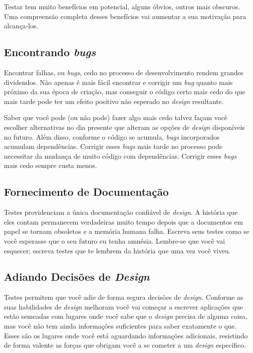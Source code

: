 Testar tem muito benefícios em potencial, alguns óbvios, outros mais obscuros. Uma compreensão completa desses benefícios vai aumentar a sua motivação para alcança-los.

\subsection{Encontrando \textit{bugs}}

Encontrar falhas, ou \textit{bugs}, cedo no processo de desenvolvimento rendem grandes dividendos. Não apenas é mais fácil encontrar e corrigir um \textit{bug} quanto mais próximo da sua época de criação, mas conseguir o código certo mais cedo do que mais tarde pode ter um efeito positivo não esperado no \textit{design} resultante.

Saber que você pode (ou não pode) fazer algo mais cedo talvez façam você escolher alternativas no dia presente que alteram as opções de \textit{design} disponíveis no futuro. Além disso, conforme o código se acumula, \textit{bugs} incorporados acumulam dependências. Corrigir esses \textit{bugs} mais tarde no processo pode necessitar da mudança de muito código com dependências. Corrigir esses \textit{bugs} mais cedo sempre custa menos.

\subsection{Fornecimento de Documentação}

Testes providenciam a única documentação confiável de \textit{design}. A história que eles contam permanecem verdadeiras muito tempo depois que a documentos em papel se tornam obsoletos e a memória humana falha. Escreva seus testes como se você esperasse que o seu futuro eu tenha amnésia. Lembre-se que você vai esquecer; escreva testes que te lembrem da história que uma vez você viveu.

\subsection{Adiando Decisões de \textit{Design}}

Testes permitem que você adie de forma segura decisões de \textit{design}. Conforme as suas habilidades de \textit{design} melhoram você vai começar a escrever aplicações que estão semeadas com lugares onde você sabe que o \textit{design} precisa de alguma coisa, mas você não tem ainda informações suficientes para saber exatamente o que. Esses são os lugares onde você está aguardando informações adicionais, resistindo de forma valente as forças que obrigam você a se cometer a um \textit{design} específico.

